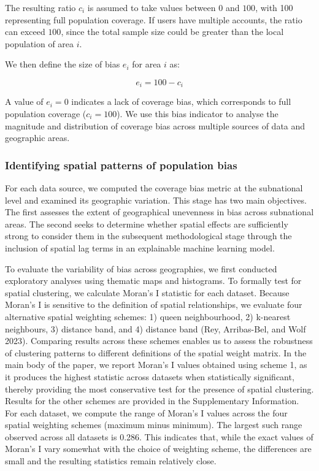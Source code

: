 \documentclass{article}
\begin{document}
The resulting ratio \(c_i\) is assumed to take values
between \(0\) and \(100\), with 100 representing full population coverage.
If users have multiple accounts, the ratio can exceed \(100\), since the
total sample size could be greater than the local population of area
\(i\).

We then define the size of bias \(e_i\) for area \(i\) as:

\begin{equation} \label{eq:size-bias}
e_i = 100 - c_i
\end{equation}

A value of \(e_i = 0\) indicates a lack of coverage bias, which
corresponds to full population coverage (\(c_i = 100\)). We use this bias
indicator to analyse the magnitude and distribution of coverage bias
across multiple sources of data and geographic areas.

\subsubsection{Identifying spatial patterns of population bias}\label{identifying-spatial-patterns-of-population-bias}

For each data source, we computed the coverage bias metric at the
subnational level and examined its geographic variation. This stage has
two main objectives. The first assesses the extent of geographical unevenness in bias
across subnational areas. The second seeks to determine whether spatial effects are
sufficiently strong to consider them in the subsequent methodological
stage through the inclusion of spatial lag terms in an explainable
machine learning model.

To evaluate the variability of bias across geographies, we first
conducted exploratory analyses using thematic maps and histograms. To
formally test for spatial clustering, we calculate Moran's I statistic
for each dataset. Because Moran's I is sensitive to the definition of
spatial relationships, we evaluate four alternative spatial weighting
schemes: 1) queen neighbourhood, 2) k-nearest neighbours, 3) distance
band, and 4) distance band (Rey, Arribas-Bel, and Wolf 2023).
Comparing results across these schemes enables us to assess the
robustness of clustering patterns to different definitions of the
spatial weight matrix. In the main body of the paper, we report Moran's
I values obtained using scheme 1, as it produces the highest statistic
across datasets when statistically significant, thereby providing the
most conservative test for the presence of spatial clustering. Results
for the other schemes are provided in the Supplementary Information. For
each dataset, we compute the range of Moran's I values across the four
spatial weighting schemes (maximum minus minimum). The largest such
range observed across all datasets is 0.286. This indicates that, while
the exact values of Moran's I vary somewhat with the choice of weighting
scheme, the differences are small and the resulting statistics remain
relatively close.
\end{document}
